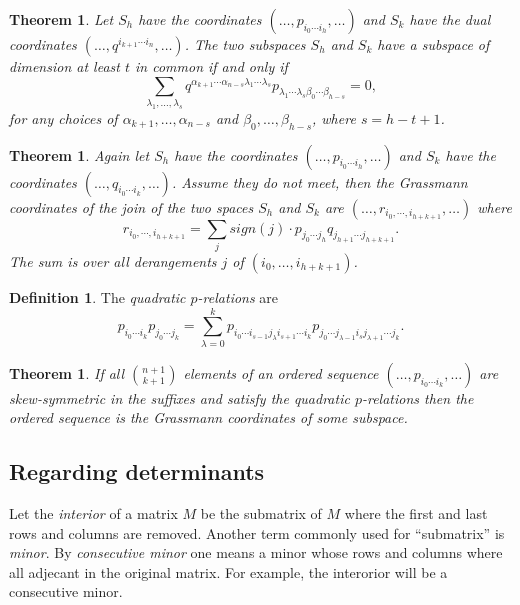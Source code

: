 \documentclass[a4paper,12pt]{book}
\theoremstyle{plain}
\newtheorem{thm}[equation]{Theorem}
\theoremstyle{definition}
\newtheorem{defi}[equation]{Definition}
\begin{document}
\begin{thm}
	Let \( S_h \) have the coordinates \( (\ldots, p_{i_0 \cdots i_h}, \ldots) \)
	and \( S_k \) have the dual
	coordinates \( (\ldots, q^{i_{k+1} \cdots i_n}, \ldots ) \). The two subspaces \( S_h \) and
	\( S_k \) have a subspace of dimension at least \( t \) in common if and only if
	\[
		\sum_{\lambda_1, \ldots, \lambda_s}
		q^{\alpha_{k+1} \cdots \alpha_{n-s} \lambda_1 \cdots \lambda_s}
		p_{\lambda_1 \cdots \lambda_s \beta_0 \cdots \beta_{h-s} } = 0 ,
	\]
	for any choices of \( \alpha_{k+1}, \ldots, \alpha_{n-s} \) and \( \beta_0, \ldots, \beta_{h-s} \),
	where \( s = h - t + 1 \).
\end{thm}

\begin{thm}
	Again let \( S_h \) have the coordinates \( (\ldots, p_{i_0 \cdots i_h}, \ldots) \)
	and \( S_k \) have the coordinates \( (\ldots, q_{i_{0} \cdots i_k}, \ldots ) \).
	Assume they do not meet, then the Grassmann coordinates of the join of the two
	spaces \( S_h \) and \( S_k \) are \( ( \ldots, r_{i_0, \cdots, i_{h+k+1}}, \ldots ) \)
	where
	\[
		r_{i_0, \cdots, i_{h+k+1}} = \sum_j
		sign(j) \cdot p_{j_0 \cdots j_h} q_{j_{h+1} \cdots j_{h + k + 1}}.
	\]
	The sum is over all derangements \( j \) of \( (i_0, \ldots, i_{h+k+1}) \).
\end{thm}

\begin{defi}
	The \emph{quadratic \( p \)-relations} are
	\[
		p_{i_0 \cdots i_k} p_{j_0 \cdots j_k} =
		\sum_{\lambda = 0}^k p_{i_0 \cdots i_{s - 1} j_{\lambda} i_{s + 1} \cdots i_k}
		p_{j_0 \cdots j_{\lambda - 1} i_s j_{\lambda + 1} \cdots j_k} .
	\]
\end{defi}

\begin{thm}
	If all \( {n+1} \choose {k+1} \) elements of an ordered sequence
	\( (\ldots, p_{i_0 \cdots i_k}, \ldots) \) are skew-symmetric in the suffixes and satisfy
	the quadratic \( p \)-relations then the ordered sequence is the Grassmann coordinates of
	some subspace.
\end{thm}

\subsection{Regarding determinants} %
\label{sub:regarding_determinants}

Let the \emph{interior} of a matrix \( M \) be the submatrix of \( M \) where the first and last
rows and columns are removed. Another term commonly used for ``submatrix'' is \emph{minor}.
By \emph{consecutive minor} one means a minor whose rows and columns where all adjecant in the
original
matrix. For example, the interorior will be a consecutive minor.
\end{document}

